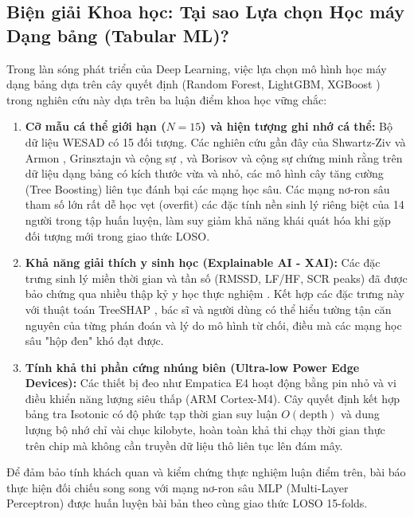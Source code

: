 \documentclass[conference]{IEEEtran}
\begin{document}
\subsection{Biện giải Khoa học: Tại sao Lựa chọn Học máy Dạng bảng (Tabular ML)?}
Trong làn sóng phát triển của Deep Learning, việc lựa chọn mô hình học máy dạng bảng dựa trên cây quyết định (Random Forest, LightGBM, XGBoost \cite{chen2016xgboost}) trong nghiên cứu này dựa trên ba luận điểm khoa học vững chắc:
\begin{enumerate}
    \item \textbf{Cỡ mẫu cá thể giới hạn ($N=15$) và hiện tượng ghi nhớ cá thể:} Bộ dữ liệu WESAD có 15 đối tượng. Các nghiên cứu gần đây của Shwartz-Ziv và Armon \cite{shwartzziv2022tabular}, Grinsztajn và cộng sự \cite{grinsztajn2022why}, và Borisov và cộng sự \cite{borisov2024deep} chứng minh rằng trên dữ liệu dạng bảng có kích thước vừa và nhỏ, các mô hình cây tăng cường (Tree Boosting) liên tục đánh bại các mạng học sâu. Các mạng nơ-ron sâu tham số lớn rất dễ học vẹt (overfit) các đặc tính nền sinh lý riêng biệt của 14 người trong tập huấn luyện, làm suy giảm khả năng khái quát hóa khi gặp đối tượng mới trong giao thức LOSO.
    \item \textbf{Khả năng giải thích y sinh học (Explainable AI - XAI):} Các đặc trưng sinh lý miền thời gian và tần số (RMSSD, LF/HF, SCR peaks) đã được bảo chứng qua nhiều thập kỷ y học thực nghiệm \cite{taskforce1996heart, greco2016cvxeda, tarvainen2014kubios}. Kết hợp các đặc trưng này với thuật toán TreeSHAP \cite{lundberg2017unified}, bác sĩ và người dùng có thể hiểu tường tận căn nguyên của từng phán đoán và lý do mô hình từ chối, điều mà các mạng học sâu "hộp đen" khó đạt được.
    \item \textbf{Tính khả thi phần cứng nhúng biên (Ultra-low Power Edge Devices):} Các thiết bị đeo như Empatica E4 \cite{garbarino2014empatica} hoạt động bằng pin nhỏ và vi điều khiển năng lượng siêu thấp (ARM Cortex-M4). Cây quyết định kết hợp bảng tra Isotonic có độ phức tạp thời gian suy luận $O(\text{depth})$ và dung lượng bộ nhớ chỉ vài chục kilobyte, hoàn toàn khả thi chạy thời gian thực trên chip mà không cần truyền dữ liệu thô liên tục lên đám mây.
\end{enumerate}

Để đảm bảo tính khách quan và kiểm chứng thực nghiệm luận điểm trên, bài báo thực hiện đối chiếu song song với mạng nơ-ron sâu MLP (Multi-Layer Perceptron) được huấn luyện bài bản theo cùng giao thức LOSO 15-folds.
\end{document}

